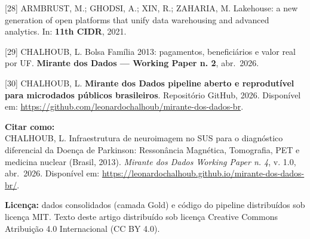 \documentclass[12pt,a4paper,oneside]{article}
\begin{document}
\begin{singlespace}
\noindent\hangindent=1.25cm\label{ref:armbrust}
[28] ARMBRUST, M.; GHODSI, A.; XIN, R.; ZAHARIA, M. Lakehouse: a
new generation of open platforms that unify data warehousing and
advanced analytics. In: \textbf{11th CIDR}, 2021.\par\smallskip

\noindent\hangindent=1.25cm\label{ref:wp-pbf}
[29] CHALHOUB, L. Bolsa Família 2013: pagamentos,
beneficiários e valor real por UF. \textbf{Mirante dos Dados —
Working Paper n. 2}, abr.\ 2026.\par\smallskip

\noindent\hangindent=1.25cm\label{ref:repo}
[30] CHALHOUB, L. \textbf{Mirante dos Dados \textendash{} pipeline
aberto e reprodutível para microdados públicos brasileiros}.
Repositório GitHub, 2026. Disponível em:
\url{https://github.com/leonardochalhoub/mirante-dos-dados-br}.\par\smallskip

\end{singlespace}

\vspace{1cm}

\noindent\textbf{Citar como:}\\
CHALHOUB, L. Infraestrutura de neuroimagem no SUS para o diagnóstico
diferencial da Doença de Parkinson: Ressonância Magnética,
Tomografia, PET e medicina nuclear (Brasil, 2013).
\textit{Mirante dos Dados \textemdash{} Working Paper n. 4}, v. 1.0,
abr.\ 2026. Disponível em:
\url{https://leonardochalhoub.github.io/mirante-dos-dados-br/}.

\vspace{0.5cm}

\noindent\textbf{Licença:} dados consolidados (camada Gold) e código
do pipeline distribuídos sob licença MIT. Texto deste artigo
distribuído sob licença Creative Commons Atribuição 4.0 Internacional
(CC BY 4.0).
\end{document}
